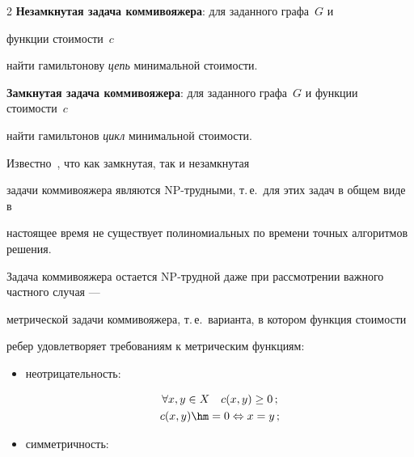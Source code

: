 \begin{multicols}{2}
\textbf{Незамкнутая задача коммивояжера}: для заданного графа~$G$ и


функции стоимости~$c$


найти гамильтонову {\it цепь} минимальной стоимости.





\textbf{Замкнутая задача коммивояжера}: для заданного графа~$G$ и функции стоимости~$c$


найти гамильтонов {\it цикл} минимальной стоимости.





Известно~\cite{Gary_Johnson, Christofides}, что как замкнутая, так и незамкнутая


задачи коммивояжера являются NP-труд\-ны\-ми, т.\,е.\ для этих задач в общем виде в


настоящее время не существует полиномиальных по времени точных алгоритмов решения.





Задача коммивояжера остается NP-трудной даже при рассмотрении важного частного случая ---


метрической задачи коммивояжера, т.\,е.\ варианта, в котором функция стоимости


ребер удовлетворяет требованиям к метрическим функциям:


\begin{itemize}


\item


неотрицательность:





\noindent


\begin{gather*}


\forall x,y \in X \quad c(x,y)\geq 0\,;


\\


c(x,y)\hm=0 \Leftrightarrow  x=y\,;


\end{gather*}


\item


симметричность:





\vspace*{2pt}






\end{itemize}
\end{multicols}
